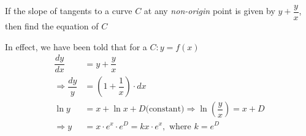 


\question If the slope of tangents to a curve $C$ at any \textit{non-origin} point is given 
by $y+\dfrac{y}{x}$, then find the equation of $C$

\insertQR[-15pt]{}

\watchout

\ifprintanswers
\fi 

\begin{solution}
  In effect, we have been told that for a $C: y = f(x)$ 
  \begin{align}
    \dfrac{dy}{dx} &= y + \dfrac{y}{x} \\
    \Rightarrow \dfrac{dy}{y} &= \left(1 + \dfrac{1}{x}\right)\cdot dx \\
    \ln y &= x + \ln x + D\text{(constant)} \Rightarrow \ln\left(\dfrac{y}{x}\right) = x + D \\
    \Rightarrow y &= x\cdot e^{x}\cdot e^{D} = kx\cdot e^{x}, \text{ where } k = e^D
  \end{align}
\end{solution}

\ifprintrubric
\fi
